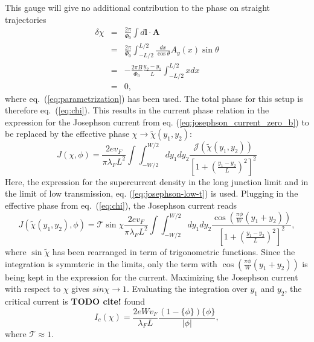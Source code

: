 This gauge will give no additional contribution to the phase on straight trajectories
\begin{eqnarray}
\delta \chi &=& \frac{2 \pi}{\Phi_0} \int d \mathbf{l} \cdot \mathbf{A} \\
&=& \frac{2 \pi}{\Phi_0} \int_{-L/2}^{L/2} \frac{dx}{\cos \theta} A_y (x) \sin \theta \\
&=& - \frac{2 \pi B}{\Phi_0} \frac{y_2 - y_1}{L} \int_{-L/2}^{L/2} x dx \\
&=& 0, \label{eq:magnetic-phase-straight}
\end{eqnarray}
where eq.~(\ref{eq:parametrization}) has been used. The total phase for this setup is therefore eq.~(\ref{eq:chi}). This results in the current phase relation in the expression for the Josephson current from eq. (\ref{eq:josephson_current_zero_b}) to be replaced by the effective phase $\chi \rightarrow \tilde{\chi}(y_1, y_2)$:
\begin{equation}
J\left(\chi, \phi \right) = \frac{2 e v_F}{\pi \lambda_F L^2}  \int \int_{-W/2}^{W/2} d y_1 d y_2 \frac{\mathcal{J}(\tilde{\chi}(y_1, y_2))}{\left[ 1 + \left(\frac{y_1 - y_2}{L}\right)^2\right]^2}
\end{equation}
Here, the expression for the supercurrent density in the long junction limit and in the limit of low transmission, eq. (\ref{eq:josephson-low-t}) is used. Plugging in the effective phase from eq.~(\ref{eq:chi}), the Josephson current reads
\begin{equation}
J(\tilde{\chi}(y_1, y_2), \phi) = \mathcal{T}  \sin \chi  \frac{2 e v_F}{\pi \lambda_F L^2} \int \int_{-W/2}^{W/2} d y_1 d y_2 \frac{\cos \left( \frac{\pi \phi}{W}(y_1 + y_2) \right)}{\left[ 1 + \left(\frac{y_1 - y_2}{L}\right)^2\right]^2} \label{eq:josephson_current},
\end{equation}
where $\sin \tilde{\chi}$ has been rearranged in term of trigonometric functions. Since the integration is symmteric in the limits, only the term with $\cos ( \frac{\pi \phi}{W}(y_1 + y_2) )$ is being kept in the expression for the current. Maximizing the Josephson current with respect to $\chi$ gives $sin\chi \rightarrow 1$. Evaluating the integration over $y_1$ and $y_2$, the critical current is \textbf{TODO cite!} found
\begin{equation}
I_c(\chi) = \frac{2e W v_F }{\lambda_F L}\frac{( 1- \{ \phi \}) \{ \phi \} }{|\phi|},
\end{equation}
where $\mathcal{T} \approx 1$.
